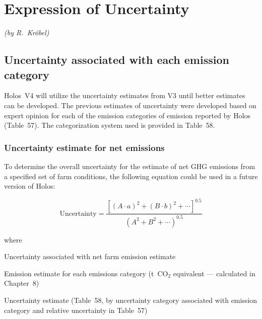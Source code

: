 \chapter{Expression of Uncertainty}
\label{ch:uncertainty}

\noindent\textit{(by R.\ Kr\"{o}bel)}

\section{Uncertainty associated with each emission category}
\label{sec:uncertainty-categories}

Holos~V4 will utilize the uncertainty estimates from V3 until better estimates
can be developed. The previous estimates of uncertainty were developed based on
expert opinion for each of the emission categories of emission reported by Holos
(Table~57). The categorization system used is provided in Table~58.

\subsection{Uncertainty estimate for net emissions}
\label{subsec:uncertainty-net}

To determine the overall uncertainty for the estimate of net GHG emissions from
a specified set of farm conditions, the following equation could be used in a
future version of Holos:

\begin{equation}
    \mathrm{Uncertainty} =
    \frac{\left[(A \cdot a)^{2} + (B \cdot b)^{2} + \cdots\right]^{0.5}}
         {\left(A^{2} + B^{2} + \cdots\right)^{0.5}}
    \tag{Eq.\ 9.1.1-1}
\end{equation}

\noindent where
\begin{description}[font=\normalfont, leftmargin=10em, style=sameline, nosep]
    \item[$\mathrm{Uncertainty}$]
        Uncertainty associated with net farm emission estimate
    \item[$A$]
        Emission estimate for each emissions category
        (t~CO$_{2}$ equivalent --- calculated in Chapter~8)
    \item[$a$]
        Uncertainty estimate (Table~58, by uncertainty category associated with
        emission category and relative uncertainty in Table~57)
\end{description}
